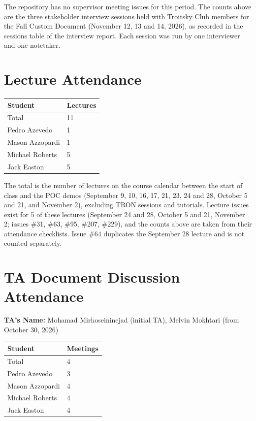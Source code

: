 \documentclass{article}
\begin{document}
The repository has no supervisor meeting issues for this period. The counts
above are the three stakeholder interview sessions held with Troitsky Club
members for the Fall Custom Document (November 12, 13 and 14, 2026), as recorded
in the sessions table of the interview report. Each session was run by one
interviewer and one notetaker.

\section{Lecture Attendance}

\begin{table}[H]
\centering
\begin{tabular}{ll}
\toprule
\textbf{Student} & \textbf{Lectures}\\
\midrule
Total & 11\\
Pedro Azevedo & 1\\
Mason Azzopardi & 1\\
Michael Roberts & 5\\
Jack Easton & 5\\
\bottomrule
\end{tabular}
\end{table}

The total is the number of lectures on the course calendar between the start
of class and the POC demos (September 9, 10, 16, 17, 21, 23, 24 and 28, October
5 and 21, and November 2), excluding TRON sessions and tutorials. Lecture issues
exist for 5 of these lectures (September 24 and 28, October 5 and 21, November
2; issues \#31, \#63, \#95, \#207, \#229), and the counts above are taken from
their attendance checklists. Issue \#64 duplicates the September 28 lecture and
is not counted separately.

\section{TA Document Discussion Attendance}

\noindent \textbf{TA's Name: } Mohamad Mirhoseininejad (initial TA), Melvin
Mokhtari (from October 30, 2026)

\begin{table}[H]
\centering
\begin{tabular}{ll}
\toprule
\textbf{Student} & \textbf{Meetings}\\
\midrule
Total & 4\\
Pedro Azevedo & 3\\
Mason Azzopardi & 4\\
Michael Roberts & 4\\
Jack Easton & 4\\
\bottomrule
\end{tabular}
\end{table}
\end{document}
